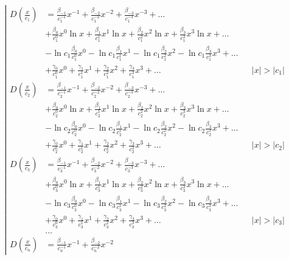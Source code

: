 \begin{equation*} \left| \begin{aligned}
D{\left(\frac{x}{c_1} \right)} &=
  \frac{\beta_{-1}}{c_1^{-1}} x^{-1}
+ \frac{\beta_{-2}}{c_1^{-2}} x^{-2}
+ \frac{\beta_{-3}}{c_1^{-3}} x^{-3}
+ \ldots \\ &
+ \frac{\beta_0}{c_1^0} x^0 \ln{x}
+ \frac{\beta_1}{c_1^1} x^1 \ln{x}
+ \frac{\beta_2}{c_1^2} x^2 \ln{x}
+ \frac{\beta_3}{c_1^3} x^3 \ln{x}
+ \ldots \\ &
- \ln{c_1} \frac{\beta_0}{c_1^0} x^0
- \ln{c_1} \frac{\beta_1}{c_1^1} x^1
- \ln{c_1} \frac{\beta_2}{c_1^2} x^2
- \ln{c_1} \frac{\beta_3}{c_1^3} x^3
+ \ldots \\ &
+ \frac{\gamma_0}{c_1^0} x^0
+ \frac{\gamma_1}{c_1^1} x^1
+ \frac{\gamma_2}{c_1^2} x^2
+ \frac{\gamma_3}{c_1^3} x^3
+ \ldots &
&|x| > |c_1| \\
%
D{\left(\frac{x}{c_2} \right)} &=
  \frac{\beta_{-1}}{c_2^{-1}} x^{-1}
+ \frac{\beta_{-2}}{c_2^{-2}} x^{-2}
+ \frac{\beta_{-3}}{c_2^{-3}} x^{-3}
+ \ldots \\ &
+ \frac{\beta_0}{c_2^0} x^0 \ln{x}
+ \frac{\beta_1}{c_2^1} x^1 \ln{x}
+ \frac{\beta_2}{c_2^2} x^2 \ln{x}
+ \frac{\beta_3}{c_2^3} x^3 \ln{x}
+ \ldots \\ &
- \ln{c_2} \frac{\beta_0}{c_2^0} x^0
- \ln{c_2} \frac{\beta_1}{c_2^1} x^1
- \ln{c_2} \frac{\beta_2}{c_2^2} x^2
- \ln{c_2} \frac{\beta_3}{c_2^3} x^3
+ \ldots \\ &
+ \frac{\gamma_0}{c_2^0} x^0
+ \frac{\gamma_1}{c_2^1} x^1
+ \frac{\gamma_2}{c_2^2} x^2
+ \frac{\gamma_3}{c_2^3} x^3
+ \ldots &
&|x| > |c_2| \\
%
D{\left(\frac{x}{c_3} \right)} &=
  \frac{\beta_{-1}}{c_3^{-1}} x^{-1}
+ \frac{\beta_{-2}}{c_3^{-2}} x^{-2}
+ \frac{\beta_{-3}}{c_3^{-3}} x^{-3}
+ \ldots \\ &
+ \frac{\beta_0}{c_3^0} x^0 \ln{x}
+ \frac{\beta_1}{c_3^1} x^1 \ln{x}
+ \frac{\beta_2}{c_3^2} x^2 \ln{x}
+ \frac{\beta_3}{c_3^3} x^3 \ln{x}
+ \ldots \\ &
- \ln{c_3} \frac{\beta_0}{c_3^0} x^0
- \ln{c_3} \frac{\beta_1}{c_3^1} x^1
- \ln{c_3} \frac{\beta_2}{c_3^2} x^2
- \ln{c_3} \frac{\beta_3}{c_3^3} x^3
+ \ldots \\ &
+ \frac{\gamma_0}{c_3^0} x^0
+ \frac{\gamma_1}{c_3^1} x^1
+ \frac{\gamma_2}{c_3^2} x^2
+ \frac{\gamma_3}{c_3^3} x^3
+ \ldots &
&|x| > |c_3| \\
%
&\ldots \\
%
D{\left(\frac{x}{c_n} \right)} &=
  \frac{\beta_{-1}}{c_n^{-1}} x^{-1}
+ \frac{\beta_{-2}}{c_n^{-2}} x^{-2}

\end{aligned}
\end{equation*}

